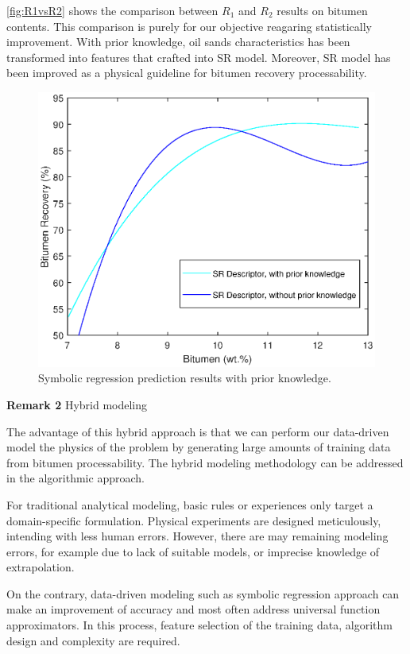 \documentclass[final,5p,times,twocolumn]{elsarticle}
\begin{document}
\autoref{fig:R1vsR2} shows the comparison between $R_1$ and $R_2$ results on bitumen contents. This comparison is purely for our objective reagaring statistically improvement. With prior knowledge, oil sands characteristics has been transformed into features that crafted into SR model. Moreover, SR model has been improved as a physical guideline for bitumen recovery processability. 

\begin{figure}[!hptb]
	\centering
	\includegraphics[width=\linewidth,clip]{R1VSR2.eps}
	\caption{Symbolic regression prediction results with prior knowledge.}
	\label{fig:R1vsR2}
\end{figure}

\noindent
\textbf{Remark 2} Hybrid modeling

The advantage of this hybrid approach is that we can perform our data-driven model the physics of the problem by generating large amounts of training data from bitumen processability. The hybrid modeling methodology can be addressed in the algorithmic approach. 

For traditional analytical modeling, basic rules or experiences only target a domain-specific formulation. Physical experiments are designed meticulously, intending with less human errors. However, there are may remaining modeling errors, for example due to lack of suitable models, or imprecise knowledge of extrapolation.

On the contrary, data-driven modeling such as symbolic regression approach can make an improvement of accuracy and most often address universal function approximators. In this process, feature selection of the training data, algorithm design and complexity are required.
\end{document}
